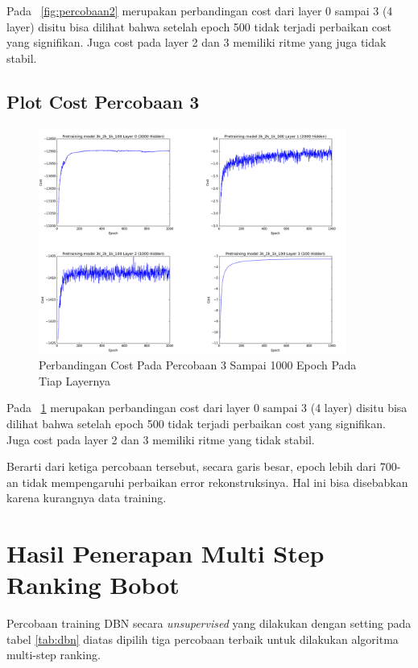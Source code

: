 Pada \pic~\ref{fig:percobaan2} merupakan perbandingan cost dari layer 0 sampai 3 (4 layer) disitu bisa dilihat bahwa setelah epoch 500 tidak terjadi perbaikan cost yang signifikan. Juga cost pada layer 2 dan 3 memiliki ritme yang juga tidak stabil.

\subsection{Plot Cost Percobaan 3}
\begin{figure}
	\centering
	\includegraphics[width=0.9\textwidth]
		{pics/percobaan_3.png}
	\caption{Perbandingan Cost Pada Percobaan 3 Sampai 1000 Epoch Pada Tiap Layernya}
	\label{fig:percobaan3}
\end{figure}
Pada \pic~\ref{fig:percobaan3} merupakan perbandingan cost dari layer 0 sampai 3 (4 layer) disitu bisa dilihat bahwa setelah epoch 500 tidak terjadi perbaikan cost yang signifikan. Juga cost pada layer 2 dan 3 memiliki ritme yang tidak stabil.

Berarti dari ketiga percobaan tersebut, secara garis besar, epoch lebih dari 700-an tidak mempengaruhi perbaikan error rekonstruksinya. Hal ini bisa disebabkan karena kurangnya data training.


\section{Hasil Penerapan Multi Step Ranking Bobot}

Percobaan training DBN secara \textit{unsupervised} yang dilakukan dengan setting pada tabel \ref{tab:dbn} diatas dipilih tiga percobaan terbaik untuk dilakukan algoritma multi-step ranking.

